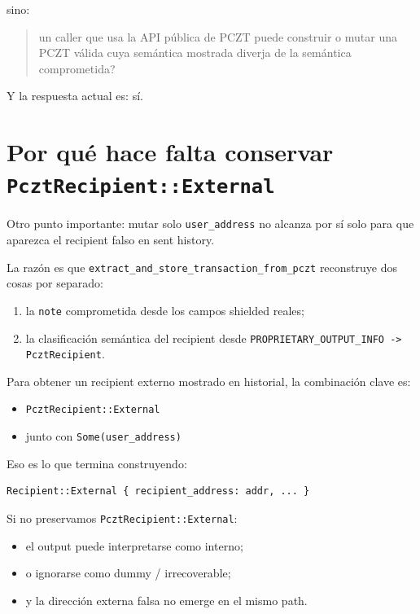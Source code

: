 \documentclass[11pt,a4paper]{article}
\begin{document}
sino:

\begin{quote}
un caller que usa la API p\'ublica de PCZT puede construir o mutar una PCZT
v\'alida cuya sem\'antica mostrada diverja de la sem\'antica comprometida?
\end{quote}

Y la respuesta actual es: s\'i.

\section{Por qu\'e hace falta conservar \texttt{PcztRecipient::External}}

Otro punto importante: mutar solo \texttt{user\_address} no alcanza por s\'i
solo para que aparezca el recipient falso en sent history.

La raz\'on es que \texttt{extract\_and\_store\_transaction\_from\_pczt}
reconstruye dos cosas por separado:

\begin{enumerate}[leftmargin=2em]
    \item la \texttt{note} comprometida desde los campos shielded reales;
    \item la clasificaci\'on sem\'antica del recipient desde
    \texttt{PROPRIETARY\_OUTPUT\_INFO -> PcztRecipient}.
\end{enumerate}

Para obtener un recipient externo mostrado en historial, la combinaci\'on clave es:

\begin{itemize}[leftmargin=2em]
    \item \texttt{PcztRecipient::External}
    \item junto con \texttt{Some(user\_address)}
\end{itemize}

Eso es lo que termina construyendo:

\begin{lstlisting}[style=plain]
Recipient::External { recipient_address: addr, ... }
\end{lstlisting}

Si no preservamos \texttt{PcztRecipient::External}:

\begin{itemize}[leftmargin=2em]
    \item el output puede interpretarse como interno;
    \item o ignorarse como dummy / irrecoverable;
    \item y la direcci\'on externa falsa no emerge en el mismo path.
\end{itemize}
\end{document}
